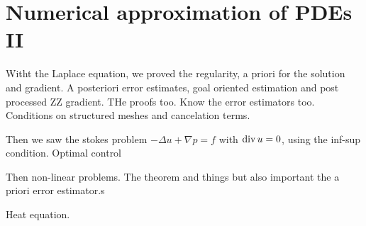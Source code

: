 
\section{Numerical approximation of PDEs II}

Witht the Laplace equation, we proved the regularity, a priori for the solution and gradient. A posteriori error estimates, goal oriented estimation and post processed ZZ gradient. THe proofs too. Know the error estimators too.
 Conditions on structured meshes and cancelation terms.

Then we saw the stokes problem $-Δu + ∇p = f$ with $\operatorname{div} u = 0$, using the inf-sup condition. Optimal control

Then non-linear problems. The theorem and things but also important the a priori error estimator.s

Heat equation.

